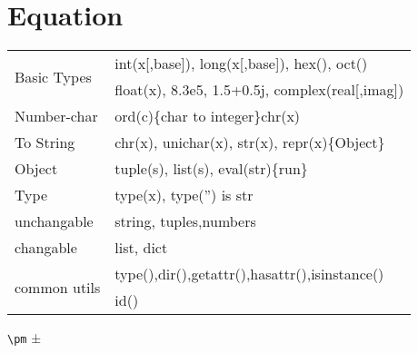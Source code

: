 \section{Equation}
\begin{tabular}{@{}l|l@{}}
    \multirow{2}{*}{Basic Types}  & {int(x[,base]), long(x[,base]), hex(), oct()} \\
    {}                            & {float(x), 8.3e5, 1.5+0.5j, complex(real[,imag])} \\
    \hline
    {Number-char}                 & {ord(c)\{char to integer\}<-->chr(x)} \\
    \hline
    {To String}                   & {chr(x), unichar(x), str(x), repr(x)\{Object\}} \\
    \hline
    {Object}                      & {tuple(s), list(s), eval(str)\{run\}} \\
    \hline
    {Type}                        & {type(x), type('') is str} \\
    \hline
    {unchangable}                 & {string, tuples,numbers} \\
    {changable}                   & {list, dict} \\
    \hline
    \multirow{2}{*}{common utils} & {type(),dir(),getattr(),hasattr(),isinstance()}\\
    {}                            & {id()}\\
\end{tabular}

\verb|\pm| ±
